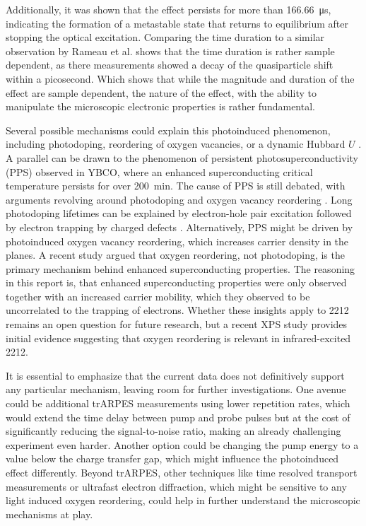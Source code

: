 Additionally, it was shown that the effect persists for more than \qty{166.66}{\micro\second}, indicating the formation of a metastable state that returns to equilibrium after stopping the optical excitation.
Comparing the time duration to a similar observation by Rameau et al. \cite{rameau_photoinduced_2014} shows that the time duration is rather sample dependent, as there measurements showed a decay of the quasiparticle shift within a picosecond.
Which shows that while the magnitude and duration of the effect are sample dependent, the nature of the effect, with the ability to manipulate the microscopic electronic properties is rather fundamental.

Several possible mechanisms could explain this photoinduced phenomenon, including photodoping, reordering of oxygen vacancies, or a dynamic Hubbard $U$ \cite{baykusheva_ultrafast_2022}.
A parallel can be drawn to the phenomenon of persistent photosuperconductivity (PPS) observed in YBCO, where an enhanced superconducting critical temperature persists for over \qty{200}{\minute}.
The cause of PPS is still debated, with arguments revolving around photodoping and oxygen vacancy reordering \cite{gilabert_photodoping_2000}.
Long photodoping lifetimes can be explained by electron-hole pair excitation followed by electron trapping by charged defects \cite{el_hage_disentangling_2024, kudinov_persistent_1993, kudinov_mechanisms_1994}.
Alternatively, PPS might be driven by photoinduced oxygen vacancy reordering, which increases carrier density in the  planes.
A recent study \cite{el_hage_disentangling_2024} argued that oxygen reordering, not photodoping, is the primary mechanism behind enhanced superconducting properties.
The reasoning in this report is, that enhanced superconducting properties were only observed together with an increased carrier mobility, which they observed to be uncorrelated to the trapping of electrons.
Whether these insights apply to 2212 remains an open question for future research, but a recent XPS study \cite{puntel_out--equilibrium_2024} provides initial evidence suggesting that oxygen reordering is relevant in infrared-excited 2212.

It is essential to emphasize that the current data does not definitively support any particular mechanism, leaving room for further investigations.
One avenue could be additional trARPES measurements using lower repetition rates, which would extend the time delay between pump and probe pulses but at the cost of significantly reducing the signal-to-noise ratio, making an already challenging experiment even harder.
Another option could be changing the pump energy to a value below the charge transfer gap, which might influence the photoinduced effect differently.
Beyond trARPES, other techniques like time resolved transport measurements or ultrafast electron diffraction, which might be sensitive to any light induced oxygen reordering, could help in further understand the microscopic mechanisms at play.

